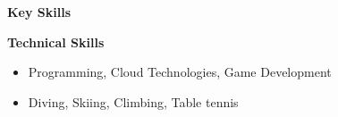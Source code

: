 \documentclass[a4paper, 11pt, final, oneside, notitlepage]{article}
\begin{document}
  \fancyfoot{}


  \textbf{Key Skills}\vspace{-\baselineskip}
  \begin{multicols}{3}
    \keyskills
  \end{multicols}

  \vspace{-\baselineskip}

  \textbf{Technical Skills}\vspace{-\parskip}
  \technicalskills





  \vspace{-\baselineskip}
  \begin{itemize}[noitemsep, nosep]
    \item Programming, Cloud Technologies, Game Development
    \item Diving, Skiing, Climbing, Table tennis
  \end{itemize}
\end{document}
